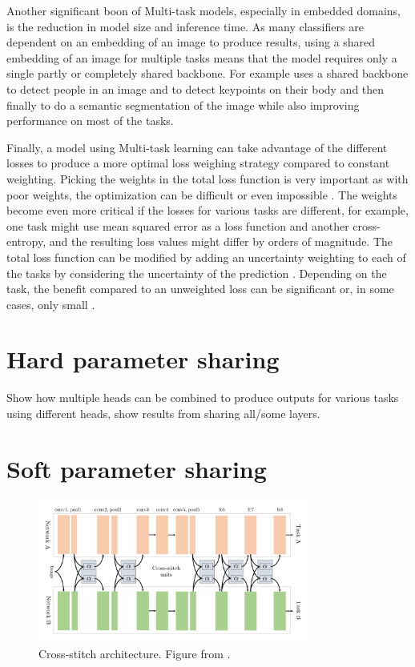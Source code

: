 Another significant boon of Multi-task models, especially in embedded domains, is the reduction in model size and inference time.
As many classifiers are dependent on an embedding of an image to produce results, using a shared embedding of an image for multiple tasks means that the model requires only a single partly or completely shared backbone.
For example \citep{multiPoseNet} uses a shared backbone to detect people in an image and to detect keypoints on their body and then finally to do a semantic segmentation of the image while also improving performance on most of the tasks.

Finally, a model using Multi-task learning can take advantage of the different losses to produce a more optimal loss weighing strategy compared to constant weighting.
Picking the weights in the total loss function is very important as with poor weights, the optimization can be difficult or even impossible \citep{lossWeighting}.
The weights become even more critical if the losses for various tasks are different, for example, one task might use mean squared error as a loss function and another cross-entropy, and the resulting loss values might differ by orders of magnitude.
The total loss function can be modified by adding an uncertainty weighting to each of the tasks by considering the uncertainty of the prediction \citep{usingUncertaintyToWeighLosses}.
Depending on the task, the benefit compared to an unweighted loss can be significant \citep{usingUncertaintyToWeighLosses} or, in some cases, only small \citep{lossWeighting}.

\section{Hard parameter sharing}
Show how multiple heads can be combined to produce outputs for various tasks using different heads, show results from sharing all/some layers. \citep{visualPerson} \citep{selfDriving} \citep{healthyDrink}

\section{Soft parameter sharing}

\begin{figure}[h!]
    \centering
    \includegraphics[width=0.8\textwidth]{imgs/stitch.png}
    \caption{Cross-stitch architecture. Figure from \citep{crossStitch}.\label{fig:params}}
\end{figure}


